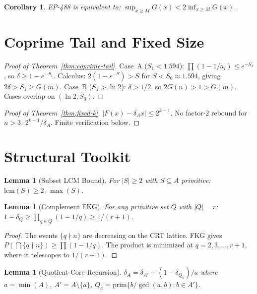 \documentclass[11pt,a4paper]{article}
\newtheorem{lemma}[theorem]{Lemma}
\newtheorem{corollary}[theorem]{Corollary}
\theoremstyle{definition}
\begin{document}
\begin{corollary}
EP-488 is equivalent to: $\sup_{x \geq M} G(x) < 2 \inf_{x \geq M} G(x)$.
\end{corollary}

\section{Coprime Tail and Fixed Size}

\begin{proof}[Proof of Theorem~\ref{thm:coprime-tail}]
Case~A ($S_1 < 1.594$): $\prod(1{-}1/a_i) \leq e^{-S_1}$, so
$\delta \geq 1 - e^{-S_1}$. Calculus: $2(1{-}e^{-S}) > S$ for
$S < S_0 \approx 1.594$, giving $2\delta > S_1 \geq G(m)$.
Case~B ($S_1 > \ln 2$): $\delta > 1/2$, so $2G(n) > 1 > G(m)$.
Cases overlap on $(\ln 2, S_0)$.
\end{proof}

\begin{proof}[Proof of Theorem~\ref{thm:fixed-k}]
$|F(x) - \delta_A x| \leq 2^{k-1}$. No factor-$2$ rebound for
$n > 3 \cdot 2^{k-1}/\delta_A$. Finite verification below.
\end{proof}

\section{Structural Toolkit}

\begin{lemma}[Subset LCM Bound]\label{lem:lcm-subset}
For $|S| \geq 2$ with $S \subseteq A$ primitive:
$\mathrm{lcm}(S) \geq 2 \cdot \max(S)$.
\end{lemma}

\begin{lemma}[Complement FKG]\label{lem:fkg}
For any primitive set $Q$ with $|Q| = r$:
$1 - \delta_Q \geq \prod_{q \in Q}(1 - 1/q) \geq 1/(r{+}1)$.
\end{lemma}

\begin{proof}
The events $\{q \nmid n\}$ are decreasing on the CRT lattice. FKG
gives $P(\bigcap\{q \nmid n\}) \geq \prod(1{-}1/q)$. The product is
minimized at $q = 2,3,\ldots,r{+}1$, where it telescopes to $1/(r{+}1)$.
\end{proof}

\begin{lemma}[Quotient-Core Recursion]\label{lem:qcr}
$\delta_A = \delta_{A'} + (1 - \delta_{Q_a})/a$ where $a = \min(A)$,
$A' = A \setminus \{a\}$, $Q_a = \mathrm{prim}\{b/\gcd(a,b) : b \in A'\}$.
\end{lemma}
\end{document}
